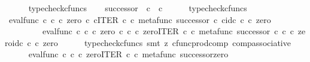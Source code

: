 \begin{isabellebody}
\ \ \ \ \isamarkupfalse%
\ typecheck{\isacharunderscore}{\kern0pt}cfuncs\isanewline
\ \ \isamarkupfalse%
\ {\isachardoublequoteopen}successor\ {\isacharcolon}{\kern0pt}\ {\isasymnat}\isactrlsub c\ {\isasymrightarrow}\ {\isasymnat}\isactrlsub c{\isachardoublequoteclose}\isanewline
\ \ \ \ \isamarkupfalse%
\ typecheck{\isacharunderscore}{\kern0pt}cfuncs\isanewline
{}\isamarkupfalse%
\isanewline
\ \ \isamarkupfalse%
\ {\isachardoublequoteopen}{\isacharparenleft}{\kern0pt}eval{\isacharunderscore}{\kern0pt}func\ {\isasymnat}\isactrlsub c\ {\isasymnat}\isactrlsub c\ {\isasymcirc}\isactrlsub c\ {\isasymlangle}zero\ {\isasymcirc}\isactrlsub c\ {\isasymbeta}\isactrlbsub {\isasymnat}\isactrlsub c\isactrlesub {\isacharcomma}{\kern0pt}ITER\ {\isasymnat}\isactrlsub c\ {\isasymcirc}\isactrlsub c\ {\isasymlangle}metafunc\ successor\ {\isasymcirc}\isactrlsub c\ {\isasymbeta}\isactrlbsub {\isasymnat}\isactrlsub c\isactrlesub {\isacharcomma}{\kern0pt}id\isactrlsub c\ {\isasymnat}\isactrlsub c{\isasymrangle}{\isasymrangle}{\isacharparenright}{\kern0pt}\ {\isasymcirc}\isactrlsub c\ zero\ {\isacharequal}{\kern0pt}\isanewline
\ \ \ \ \ \ \ \ \ eval{\isacharunderscore}{\kern0pt}func\ {\isasymnat}\isactrlsub c\ {\isasymnat}\isactrlsub c\ {\isasymcirc}\isactrlsub c\ {\isasymlangle}zero\ {\isasymcirc}\isactrlsub c\ {\isasymbeta}\isactrlbsub {\isasymnat}\isactrlsub c\isactrlesub \ {\isasymcirc}\isactrlsub c\ zero{\isacharcomma}{\kern0pt}ITER\ {\isasymnat}\isactrlsub c\ {\isasymcirc}\isactrlsub c\ {\isasymlangle}metafunc\ successor\ {\isasymcirc}\isactrlsub c\ {\isasymbeta}\isactrlbsub {\isasymnat}\isactrlsub c\isactrlesub \ {\isasymcirc}\isactrlsub c\ zero{\isacharcomma}{\kern0pt}id\isactrlsub c\ {\isasymnat}\isactrlsub c\ {\isasymcirc}\isactrlsub c\ zero{\isasymrangle}{\isasymrangle}{\isachardoublequoteclose}\isanewline
\ \ \ \ \isamarkupfalse%
\ {\isacharparenleft}{\kern0pt}typecheck{\isacharunderscore}{\kern0pt}cfuncs{\isacharcomma}{\kern0pt}\ smt\ {\isacharparenleft}{\kern0pt}z{}{\isacharparenright}{\kern0pt}\ cfunc{\isacharunderscore}{\kern0pt}prod{\isacharunderscore}{\kern0pt}comp\ comp{\isacharunderscore}{\kern0pt}associative{}{\isacharparenright}{\kern0pt}\isanewline
\ \ \isamarkupfalse%
\ \isamarkupfalse%
\ {\isachardoublequoteopen}{\isachardot}{\kern0pt}{\isachardot}{\kern0pt}{\isachardot}{\kern0pt}\ {\isacharequal}{\kern0pt}\ \ eval{\isacharunderscore}{\kern0pt}func\ {\isasymnat}\isactrlsub c\ {\isasymnat}\isactrlsub c\ {\isasymcirc}\isactrlsub c\ {\isasymlangle}zero{\isacharcomma}{\kern0pt}ITER\ {\isasymnat}\isactrlsub c\ {\isasymcirc}\isactrlsub c\ {\isasymlangle}metafunc\ successor{\isacharcomma}{\kern0pt}zero{\isasymrangle}{\isasymrangle}{\isachardoublequoteclose}\isanewline

\end{isabellebody}
